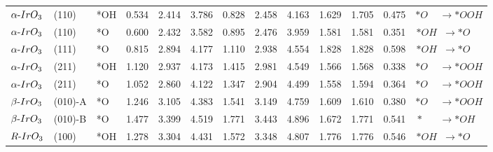 \begin{tabular}{lllcccccccccc}
 $\alpha{\text -}IrO_{3}$ &    (110) &         *OH &           0.534 &          2.414 &            3.786 &           0.828 &          2.458 &            4.163 &                        1.629 &     1.705 &  0.475 &                         $*O \phantom{T} \phantom{T}  \rightarrow *OOH$ \\
 $\alpha{\text -}IrO_{3}$ &    (110) &          *O &           0.600 &          2.432 &            3.582 &           0.895 &          2.476 &            3.959 &                        1.581 &     1.581 &  0.351 &              $*OH \phantom{T} \rightarrow *O \phantom{T} \phantom{T} $ \\
 $\alpha{\text -}IrO_{3}$ &    (111) &          *O &           0.815 &          2.894 &            4.177 &           1.110 &          2.938 &            4.554 &                        1.828 &     1.828 &  0.598 &              $*OH \phantom{T} \rightarrow *O \phantom{T} \phantom{T} $ \\
 $\alpha{\text -}IrO_{3}$ &    (211) &         *OH &           1.120 &          2.937 &            4.173 &           1.415 &          2.981 &            4.549 &                        1.566 &     1.568 &  0.338 &                         $*O \phantom{T} \phantom{T}  \rightarrow *OOH$ \\
 $\alpha{\text -}IrO_{3}$ &    (211) &          *O &           1.052 &          2.860 &            4.122 &           1.347 &          2.904 &            4.499 &                        1.558 &     1.594 &  0.364 &                         $*O \phantom{T} \phantom{T}  \rightarrow *OOH$ \\
  $\beta{\text -}IrO_{3}$ &  (010)-A &          *O &           1.246 &          3.105 &            4.383 &           1.541 &          3.149 &            4.759 &                        1.609 &     1.610 &  0.380 &                         $*O \phantom{T} \phantom{T}  \rightarrow *OOH$ \\
  $\beta{\text -}IrO_{3}$ &  (010)-B &          *O &           1.477 &          3.399 &            4.519 &           1.771 &          3.443 &            4.896 &                        1.672 &     1.771 &  0.541 &  $* \phantom{T} \phantom{T} \phantom{T}  \rightarrow *OH \phantom{T} $ \\
      $R{\text -}IrO_{3}$ &    (100) &         *OH &           1.278 &          3.304 &            4.431 &           1.572 &          3.348 &            4.807 &                        1.776 &     1.776 &  0.546 &              $*OH \phantom{T} \rightarrow *O \phantom{T} \phantom{T} $ \\

\end{tabular}
